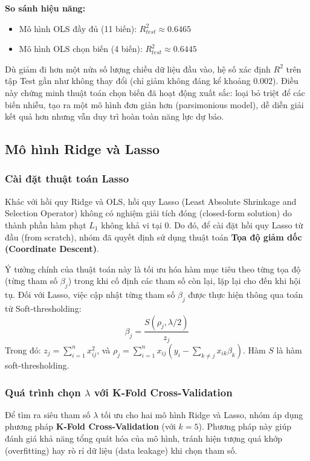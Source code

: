 \textbf{So sánh hiệu năng:}
\begin{itemize}
    \item Mô hình OLS đầy đủ (11 biến): $R^2_{test} \approx 0.6465$
    \item Mô hình OLS chọn biến (4 biến): $R^2_{test} \approx 0.6445$
\end{itemize}
Dù giảm đi hơn một nửa số lượng chiều dữ liệu đầu vào, hệ số xác định $R^2$ trên tập Test gần như không thay đổi (chỉ giảm không đáng kể khoảng $0.002$). Điều này chứng minh thuật toán chọn biến đã hoạt động xuất sắc: loại bỏ triệt để các biến nhiễu, tạo ra một mô hình đơn giản hơn (parsimonious model), dễ diễn giải kết quả hơn nhưng vẫn duy trì hoàn toàn năng lực dự báo.

\subsection{Mô hình Ridge và Lasso}

\subsubsection{Cài đặt thuật toán Lasso}
Khác với hồi quy Ridge và OLS, hồi quy Lasso (Least Absolute Shrinkage and Selection Operator) không có nghiệm giải tích đóng (closed-form solution) do thành phần hàm phạt $L_1$ không khả vi tại $0$. Do đó, để cài đặt hồi quy Lasso từ đầu (from scratch), nhóm đã quyết định sử dụng thuật toán \textbf{Tọa độ giảm dốc (Coordinate Descent)}. 

Ý tưởng chính của thuật toán này là tối ưu hóa hàm mục tiêu theo từng tọa độ (từng tham số $\beta_j$) trong khi cố định các tham số còn lại, lặp lại cho đến khi hội tụ. Đối với Lasso, việc cập nhật từng tham số $\beta_j$ được thực hiện thông qua toán tử Soft-thresholding:
\[ \beta_j = \frac{S(\rho_j, \lambda / 2)}{z_j} \]
Trong đó: $z_j = \sum_{i=1}^n x_{ij}^2$, và $\rho_j = \sum_{i=1}^n x_{ij} \left( y_i - \sum_{k \neq j} x_{ik} \beta_k \right)$. Hàm $S$ là hàm soft-thresholding.

\subsubsection{Quá trình chọn $\lambda$ với K-Fold Cross-Validation}
Để tìm ra siêu tham số $\lambda$ tối ưu cho hai mô hình Ridge và Lasso, nhóm áp dụng phương pháp \textbf{K-Fold Cross-Validation} (với $k=5$). Phương pháp này giúp đánh giá khả năng tổng quát hóa của mô hình, tránh hiện tượng quá khớp (overfitting) hay rò rỉ dữ liệu (data leakage) khi chọn tham số. 


